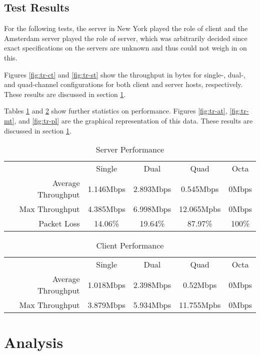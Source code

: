 \subsection{Test Results}

For the following tests, the server in New York played the role of client and the Amsterdam server played the role of server, which was arbitrarily decided since exact specifications on the servers are unknown and thus could not weigh in on this.

Figures \ref{fig:tr-ct} and \ref{fig:tr-st} show the throughput in bytes for single-, dual-, and quad-channel configurations for both client and server hosts, respectively. These results are discussed in section \ref{sec:anlys}.

Tables \ref{tab:server-perf} and \ref{tab:client-perf} show further statistics on performance. Figures \ref{fig:tr-at}, \ref{fig:tr-mt}, and \ref{fig:tr-pl} are the graphical representation of this data. These results are discussed in section \ref{sec:anlys}.

\begin{table}[H]
\centering
\caption{Server Performance}
\label{tab:server-perf}
\begin{tabular}{rcccc}
\multicolumn{1}{c}{} & Single    & Dual      & Quad       & Octa  \\
Average Throughput   & 1.146Mbps & 2.893Mbps & 0.545Mbps  & 0Mbps \\
Max Throughput       & 4.385Mbps & 6.998Mbps & 12.065Mpbs & 0Mbps \\
Packet Loss          & 14.06\%   & 19.64\%   & 87.97\%    & 100\%
\end{tabular}
\end{table}

\begin{table}[H]
\centering
\caption{Client Performance}
\label{tab:client-perf}
\begin{tabular}{rcccc}
\multicolumn{1}{c}{} & Single    & Dual      & Quad       & Octa  \\
Average Throughput   & 1.018Mbps & 2.398Mbps & 0.52Mbps  & 0Mbps \\
Max Throughput       & 3.879Mbps & 5.934Mbps & 11.755Mpbs & 0Mbps
\end{tabular}
\end{table}


\section{Analysis}\label{sec:anlys}

